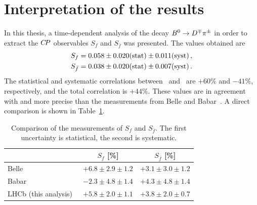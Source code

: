 \section{Interpretation of the results}
\label{sec:results}

In this thesis, a time-dependent analysis of the decay $B^0\rightarrow D^\mp\pi^\pm$ in order to extract the $C\!P$ observables $S_{f}$ and $S_{\bar f}$ was presented. The values obtained are
\begin{align}
 \mbox{\ensuremath{S_f}} = \mbox{\ensuremath{0.058}} \pm \mbox{\ensuremath{0.020}}\mathrm{(stat)} \pm \mbox{\ensuremath{0.011}} \mathrm{(syst)}\,, \label{eq:result_Sf}\\
\mbox{\ensuremath{S_{\bar{f}}}} = \mbox{\ensuremath{0.038}} \pm \mbox{\ensuremath{0.020}}\mathrm{(stat)} \pm \mbox{\ensuremath{0.007}} \mathrm{(syst)}\,. \label{eq:result_Sfbar}
\end{align}
The statistical and systematic correlations between \Sf~and \Sfb~are $+60\%$ and $-41\%$, respectively,
and the total correlation is $+44\%$.
These values are in agreement with and more precise than the measurements
from Belle and Babar~\cite{PhysRevD.73.092003,Aubert:2006tw}. A direct comparison is shown in Table~\ref{tab:results_comparison}.
\begin{table}[btp]
	\centering
	\caption{Comparison of the measurements of $S_{f}$ and
	$S_{\bar f}$. The first uncertainty is statistical, the second is systematic.}
	\begin{tabular}{lcc}
		\toprule
		 & $S_{f}$ [\%] & $S_{\bar f}$ [\%] \\
		\midrule
		Belle~\cite{PhysRevD.73.092003} & $+6.8 \pm 2.9 \pm 1.2 $ & $+3.1 \pm 3.0 \pm 1.2 $ \\
                Babar~\cite{Aubert:2006tw} & $-2.3 \pm 4.8 \pm 1.4 $ & $+4.3 \pm 4.8 \pm 1.4 $\\
                LHCb (this analysis)~\cite{Aaij:2018kpq} & $+5.8 \pm 2.0 \pm 1.1 $ & $+3.8 \pm 2.0 \pm 0.7$ \\
		\bottomrule
	\end{tabular}
	\label{tab:results_comparison}
\end{table}

